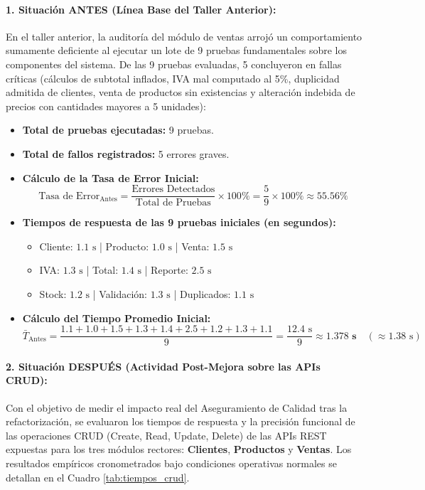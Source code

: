 \documentclass{article}
\begin{document}
\paragraph{1. Situación ANTES (Línea Base del Taller Anterior):}
En el taller anterior, la auditoría del módulo de ventas arrojó un comportamiento sumamente deficiente al ejecutar un lote de 9 pruebas fundamentales sobre los componentes del sistema. De las 9 pruebas evaluadas, 5 concluyeron en fallas críticas (cálculos de subtotal inflados, IVA mal computado al 5\%, duplicidad admitida de clientes, venta de productos sin existencias y alteración indebida de precios con cantidades mayores a 5 unidades):
\begin{itemize}
    \item \textbf{Total de pruebas ejecutadas:} 9 pruebas.
    \item \textbf{Total de fallos registrados:} 5 errores graves.
    \item \textbf{Cálculo de la Tasa de Error Inicial:}
    \begin{equation}
        \text{Tasa de Error}_{\text{Antes}} = \frac{\text{Errores Detectados}}{\text{Total de Pruebas}} \times 100\% = \frac{5}{9} \times 100\% \approx \mathbf{55.56\%}
    \end{equation}
    \item \textbf{Tiempos de respuesta de las 9 pruebas iniciales (en segundos):}
    \begin{itemize}
        \item Cliente: $1.1\text{ s}$ \quad | \quad Producto: $1.0\text{ s}$ \quad | \quad Venta: $1.5\text{ s}$
        \item IVA: $1.3\text{ s}$ \quad | \quad Total: $1.4\text{ s}$ \quad | \quad Reporte: $2.5\text{ s}$
        \item Stock: $1.2\text{ s}$ \quad | \quad Validación: $1.3\text{ s}$ \quad | \quad Duplicados: $1.1\text{ s}$
    \end{itemize}
    \item \textbf{Cálculo del Tiempo Promedio Inicial:}
    \begin{equation}
        \bar{T}_{\text{Antes}} = \frac{1.1 + 1.0 + 1.5 + 1.3 + 1.4 + 2.5 + 1.2 + 1.3 + 1.1}{9} = \frac{12.4\text{ s}}{9} \approx \mathbf{1.378\text{ s}} \quad (\approx 1.38\text{ s})
    \end{equation}
\end{itemize}

\paragraph{2. Situación DESPUÉS (Actividad Post-Mejora sobre las APIs CRUD):}
Con el objetivo de medir el impacto real del Aseguramiento de Calidad tras la refactorización, se evaluaron los tiempos de respuesta y la precisión funcional de las operaciones CRUD (Create, Read, Update, Delete) de las APIs REST expuestas para los tres módulos rectores: \textbf{Clientes}, \textbf{Productos} y \textbf{Ventas}. Los resultados empíricos cronometrados bajo condiciones operativas normales se detallan en el Cuadro \ref{tab:tiempos_crud}.
\end{document}
